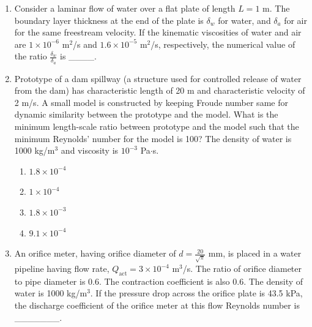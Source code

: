 \documentclass[journal,12pt,onecolumn]{IEEEtran}
\theoremstyle{remark}
\begin{document}
\begin{enumerate}
\item Consider a laminar flow of water over a flat plate of length $L = 1$ m. The boundary layer thickness at the end of the plate is $\delta_w$ for water, and $\delta_a$ for air for the same freestream velocity. If the kinematic viscosities of water and air are $1 \times 10^{-6}$ m$^2$/s and $1.6 \times 10^{-5}$ m$^2$/s, respectively, the numerical value of the ratio $\frac{\delta_w}{\delta_a}$ is \_\_\_\_.\\


\item Prototype of a dam spillway (a structure used for controlled release of water from the dam) has characteristic length of 20 m and characteristic velocity of 2 m/s. A small model is constructed by keeping Froude number same for dynamic similarity between the prototype and the model. What is the minimum length-scale ratio between prototype and the model such that the minimum Reynolds' number for the model is 100? The density of water is 1000 kg/m$^3$ and viscosity is $10^{-3}$ Pa$\cdot$s.

\begin{multicols}{4}
	\begin{enumerate}
		\item $1.8 \times 10^{-4}$
		\item $1 \times 10^{-4}$
		\item $1.8 \times 10^{-3}$
		\item $9.1 \times 10^{-4}$
	\end{enumerate}
\end{multicols}

\item An orifice meter, having orifice diameter of $d = \frac{20}{\sqrt{\pi}}$ mm, is placed in a water pipeline having flow rate, $Q_{\text{act}} = 3 \times 10^{-4}$ m$^3$/s. The ratio of orifice diameter to pipe diameter is 0.6. The contraction coefficient is also 0.6. The density of water is 1000 kg/m$^3$. If the pressure drop across the orifice plate is 43.5 kPa, the discharge coefficient of the orifice meter at this flow Reynolds number is \_\_\_\_\_\_\_.

\end{enumerate}
\end{document}
